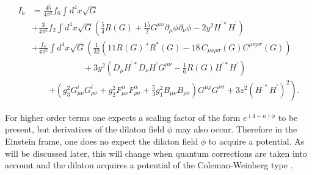 \documentclass[12pt]{article}%
\begin{document}
\begin{align}
I_{b}  &  =\frac{45}{4\pi^{2}}f_{0}\int d^{4}x\sqrt{G}\\
&  +\frac{3}{4\pi^{2}}f_{2}\int d^{4}x\sqrt{G}\left(  \frac{5}{4}R\left(
G\right)  +\frac{15}{2}G^{\mu\nu}\partial_{\mu}\phi\partial_{\nu}\phi
-2y^{2}H^{^{\prime}\ast}H^{^{\prime}}\right) \nonumber\\
&  +\frac{f_{4}}{4\pi^{2}}\int d^{4}x\sqrt{G}\left(  \frac{1}{32}\left(
11R\left(  G\right)  \,^{\ast}R^{\ast}\left(  G\right)  -18\,C_{\mu\nu
\rho\sigma}\left(  G\right)  C^{\mu\nu\rho\sigma}\left(  G\right)  \right)
\right. \nonumber\\
&  \hspace{1in}+3y^{2}\left(  D_{\mu}H^{^{\prime}\ast}D_{\nu}H^{\prime}%
G^{\mu\nu}-\frac{1}{6}R\left(  G\right)  H^{\prime\ast}H^{\prime}\right)
\nonumber\\
&  \qquad\left.  +\left(  g_{3}^{2}G_{\mu\nu}^{i}G_{\rho\sigma}^{i}+g_{2}%
^{2}F_{\mu\nu}^{\alpha}F_{\rho\sigma}^{\alpha}+\frac{5}{3}g_{1}^{2}B_{\mu\nu
}B_{\rho\sigma}\right)  G^{\mu\rho}G^{\nu\sigma}+3z^{2}\left(  H^{^{\prime
}\ast}H^{\prime}\right)  ^{2}\right)  .\nonumber
\end{align}


For higher order terms one expects a scaling factor of the form $e^{\left(
4-n\right)  \phi}$ to be present, but derivatives of the dilaton field $\phi$
may also occur. Therefore in the Einstein frame, one does no expect the
dilaton field $\phi$ to acquire a potential. As will be discussed later, this
will change when quantum corrections are taken into account and the dilaton
acquires a potential of the Coleman-Weinberg type \cite{CW}.
\end{document}
